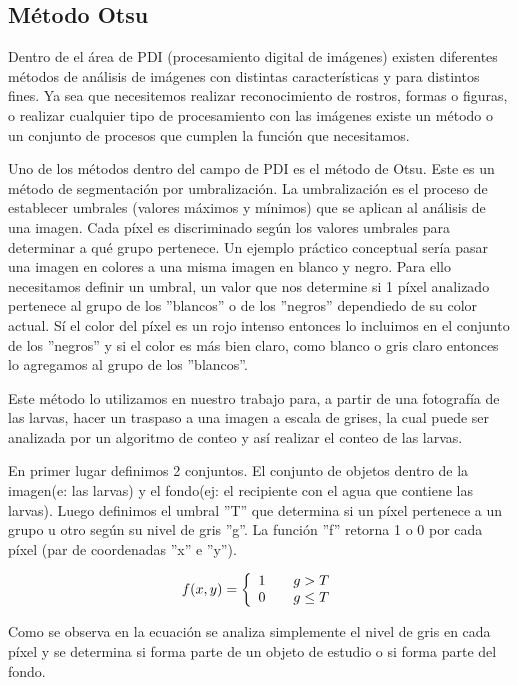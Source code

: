 \subsection{Método Otsu}
Dentro de el área de PDI (procesamiento digital de imágenes) existen diferentes métodos de análisis
de imágenes con distintas características y para distintos fines. Ya sea que necesitemos realizar
reconocimiento de rostros, formas o figuras, o realizar cualquier tipo de procesamiento con las 
imágenes existe un método o un conjunto de procesos que cumplen la función que necesitamos.

Uno de los métodos dentro del campo de PDI es el método de Otsu. Este es un método de segmentación por
umbralización. La umbralización es el proceso de establecer umbrales (valores máximos y mínimos) que se
aplican al análisis de una imagen. Cada píxel es discriminado según los valores umbrales para determinar
a qué grupo pertenece. Un ejemplo práctico conceptual sería pasar una imagen en colores a una misma
imagen en blanco y negro. Para ello necesitamos definir un umbral, un valor que nos determine si 1 píxel
analizado pertenece al grupo de los ”blancos” o de los ”negros” dependiedo de su color actual. Sí el
color del píxel es un rojo intenso entonces lo incluimos en el conjunto de los ”negros” y si el color es
más bien claro, como blanco o gris claro entonces lo agregamos al grupo de los ”blancos”.

Este método lo utilizamos en nuestro trabajo para, a partir de una fotografía de las larvas, hacer un
traspaso a una imagen a escala de grises, la cual puede ser analizada por un algoritmo de conteo y así
realizar el conteo de las larvas.

En primer lugar definimos 2 conjuntos. El conjunto de objetos dentro de la imagen(e: las larvas) y el
fondo(ej: el recipiente con el agua que contiene las larvas). Luego definimos el umbral ”T” que
determina si un píxel pertenece a un grupo u otro según su nivel de gris ”g”. La función ”f” retorna 1 
o 0 por cada píxel (par de coordenadas ”x” e ”y”).

\begin{equation}
f(x, y) =\left\{
  \begin{array}{l l}
    1 & \quad g > T\\
    0 & \quad g \leq T
  \end{array} \right.
\end{equation}

Como se observa en la ecuación se analiza simplemente el nivel de gris en cada píxel y se determina si
forma parte de un objeto de estudio o si forma parte del fondo.
